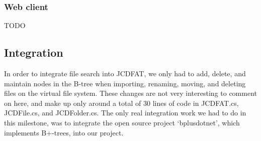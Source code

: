 \documentclass[a4paper,12pt]{article}
\begin{document}
\subsubsection{Web client}

TODO

\subsection{Integration}
In order to integrate file search into JCDFAT, we only had to add, delete, and maintain nodes in the B-tree when importing, renaming, moving, and deleting files on the virtual file system. These changes are not very interesting to comment on here, and make up only around a total of 30 lines of code in JCDFAT.cs, JCDFile.cs, and JCDFolder.cs. The only real integration work we had to do in this milestone, was to integrate the open source project `bplusdotnet', which implements B+-trees, into our project.





\end{document}
